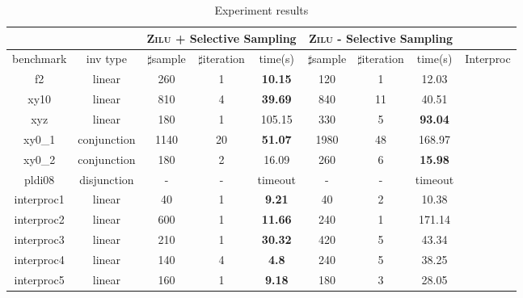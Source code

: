 \begin{table}[t]
\scriptsize
\centering
\caption{Experiment results}
\begin{tabular}{l c | c c c | c c c | c }
\cline{3-8}
& &\multicolumn{3}{|c|}{\textsc{Zilu} + Selective Sampling}&\multicolumn{3}{c|}{\textsc{Zilu} - Selective Sampling} & \\
\hline
\multicolumn{1}{|c|}{benchmark}&\multicolumn{1}{|c|}{inv type}& $\sharp$sample & $\sharp$iteration & time(s) & $\sharp$sample & $\sharp$iteration &time(s) & \multicolumn{1}{|c|}{Interproc} \\
\hline %
\multicolumn{1}{|c|}{f2}         						&linear 		&260 &1 &\textbf{10.15}  		&120 &1   &12.03  			&\multicolumn{1}{|c|}{\cmark} \\
\multicolumn{1}{|c|}{xy10} 	        					&linear 		&810 &4 &\textbf{39.69} 		&840  &11  &40.51  			&\multicolumn{1}{|c|}{\cmark} \\
\multicolumn{1}{|c|}{xyz}   	      					&linear 		&180 &1 &105.15  				&330  &5  &\textbf{93.04}  	&\multicolumn{1}{|c|}{\cmark} \\
\multicolumn{1}{|c|}{xy0\_1}         					&conjunction 	&1140 &20 &\textbf{51.07}		&1980 &48 &168.97  			&\multicolumn{1}{|c|}{\cmark} \\
\multicolumn{1}{|c|}{xy0\_2}         					&conjunction 	&180  &2 &16.09					&260 &6 &\textbf{15.98}  	&\multicolumn{1}{|c|}{\cmark} \\
\multicolumn{1}{|c|}{pldi08} 		        			&disjunction 	&- & - &timeout  				&-  &-  &timeout  		&\multicolumn{1}{|c|}{\xmark} \\

\multicolumn{1}{|c|}{interproc1}         				&linear 		&40 &1 &\textbf{9.21}  			&40 &2   &10.38  			&\multicolumn{1}{|c|}{\cmark} \\
\multicolumn{1}{|c|}{interproc2}         				&linear 		&600 &1 &\textbf{11.66} 		&240  &1  &171.14  			&\multicolumn{1}{|c|}{\cmark} \\
\multicolumn{1}{|c|}{interproc3}         				&linear 		&210 &1 &\textbf{30.32}  		&420 &5   &43.34  			&\multicolumn{1}{|c|}{\cmark} \\
\multicolumn{1}{|c|}{interproc4}         				&linear 		&140 &4 &\textbf{4.8}  			&240 &5   &38.25  			&\multicolumn{1}{|c|}{\xmark} \\
\multicolumn{1}{|c|}{interproc5}         				&linear 		&160 &1 &\textbf{9.18}  		&180 &3   &28.05  			&\multicolumn{1}{|c|}{\cmark} \\


\end{tabular}
\end{table}
